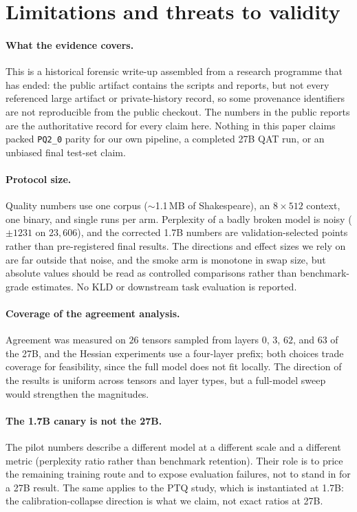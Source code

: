 \section{Limitations and threats to validity}
\label{sec:limitations}

\paragraph{What the evidence covers.}
This is a historical forensic write-up assembled from a research programme that
has ended: the public artifact contains the scripts and reports, but not every
referenced large artifact or private-history record, so some provenance
identifiers are not reproducible from the public checkout. The numbers in the
public reports are the authoritative record for every claim here. Nothing in
this paper claims packed \texttt{PQ2\_0} parity for our own pipeline, a
completed 27B QAT run, or an unbiased final test-set claim.

\paragraph{Protocol size.}
Quality numbers use one corpus ($\sim$1.1\,MB of Shakespeare), an $8\times512$
context, one binary, and single runs per arm. Perplexity of a badly broken
model is noisy ($\pm 1231$ on $23{,}606$), and the corrected 1.7B numbers are
validation-selected points rather than pre-registered final results. The
directions and effect sizes we rely on are far outside that noise, and the
smoke arm is monotone in swap size, but absolute values should be read as
controlled comparisons rather than benchmark-grade estimates. No KLD or
downstream task evaluation is reported.

\paragraph{Coverage of the agreement analysis.}
Agreement was measured on $26$ tensors sampled from layers $0$, $3$, $62$, and
$63$ of the 27B, and the Hessian experiments use a four-layer prefix; both
choices trade coverage for feasibility, since the full model does not fit
locally. The direction of the results is uniform across tensors and layer
types, but a full-model sweep would strengthen the magnitudes.

\paragraph{The 1.7B canary is not the 27B.}
The pilot numbers describe a different model at a different scale and a
different metric (perplexity ratio rather than benchmark retention). Their
role is to price the remaining training route and to expose evaluation
failures, not to stand in for a 27B result. The same applies to the PTQ study,
which is instantiated at 1.7B: the calibration-collapse direction is what we
claim, not exact ratios at 27B.

